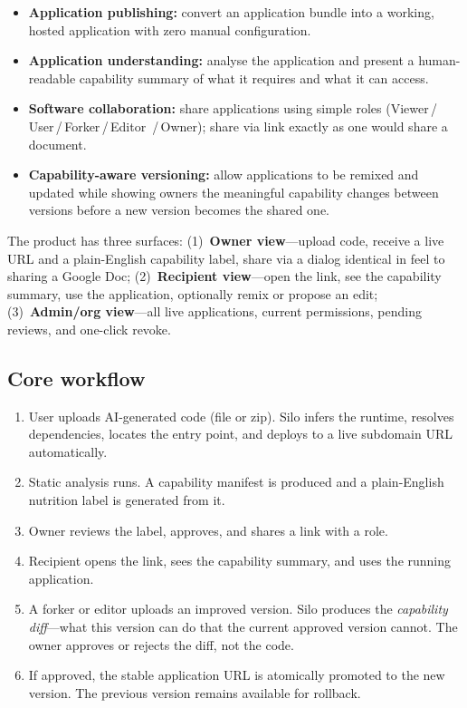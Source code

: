 \documentclass[11pt,a4paper]{article}
\begin{document}
\begin{itemize}[leftmargin=0.7cm]
  \item \textbf{Application publishing:} convert an application bundle into a working,
    hosted application with zero manual configuration.
  \item \textbf{Application understanding:} analyse the application and present a
    human-readable capability summary of what it requires and what it can access.
  \item \textbf{Software collaboration:} share applications using simple roles
    (Viewer\,/\,User\,/\,Forker\,/\,Editor\, /\,Owner); share via link exactly as one
    would share a document.
  \item \textbf{Capability-aware versioning:} allow applications to be remixed and
    updated while showing owners the meaningful capability changes between versions
    before a new version becomes the shared one.
\end{itemize}

The product has three surfaces: (1)~\textbf{Owner view}---upload code, receive a live
URL and a plain-English capability label, share via a dialog identical in feel to sharing
a Google Doc; (2)~\textbf{Recipient view}---open the link, see the capability summary,
use the application, optionally remix or propose an edit;
(3)~\textbf{Admin/org view}---all live applications, current permissions, pending reviews,
and one-click revoke.

\subsection{Core workflow}
\begin{enumerate}[leftmargin=0.7cm]
  \item User uploads AI-generated code (file or zip). Silo infers the runtime, resolves
    dependencies, locates the entry point, and deploys to a live subdomain URL
    automatically.
  \item Static analysis runs. A capability manifest is produced and a plain-English
    nutrition label is generated from it.
  \item Owner reviews the label, approves, and shares a link with a role.
  \item Recipient opens the link, sees the capability summary, and uses the running
    application.
  \item A forker or editor uploads an improved version. Silo produces the
    \emph{capability diff}---what this version can do that the current approved version
    cannot. The owner approves or rejects the diff, not the code.
  \item If approved, the stable application URL is atomically promoted to the new
    version. The previous version remains available for rollback.
\end{enumerate}
\end{document}
